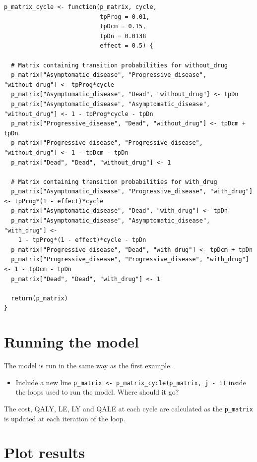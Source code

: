 \begin{verbatim}
p_matrix_cycle <- function(p_matrix, cycle,
                           tpProg = 0.01,
                           tpDcm = 0.15,
                           tpDn = 0.0138
                           effect = 0.5) {
  
  # Matrix containing transition probabilities for without_drug
  p_matrix["Asymptomatic_disease", "Progressive_disease", "without_drug"] <- tpProg*cycle
  p_matrix["Asymptomatic_disease", "Dead", "without_drug"] <- tpDn
  p_matrix["Asymptomatic_disease", "Asymptomatic_disease", "without_drug"] <- 1 - tpProg*cycle - tpDn
  p_matrix["Progressive_disease", "Dead", "without_drug"] <- tpDcm + tpDn
  p_matrix["Progressive_disease", "Progressive_disease", "without_drug"] <- 1 - tpDcm - tpDn
  p_matrix["Dead", "Dead", "without_drug"] <- 1
  
  # Matrix containing transition probabilities for with_drug
  p_matrix["Asymptomatic_disease", "Progressive_disease", "with_drug"] <- tpProg*(1 - effect)*cycle
  p_matrix["Asymptomatic_disease", "Dead", "with_drug"] <- tpDn
  p_matrix["Asymptomatic_disease", "Asymptomatic_disease", "with_drug"] <-
    1 - tpProg*(1 - effect)*cycle - tpDn
  p_matrix["Progressive_disease", "Dead", "with_drug"] <- tpDcm + tpDn
  p_matrix["Progressive_disease", "Progressive_disease", "with_drug"] <- 1 - tpDcm - tpDn
  p_matrix["Dead", "Dead", "with_drug"] <- 1

  return(p_matrix)
}
\end{verbatim}

%
\section{Running the model}
The model is run in the same way as the first example.

\begin{itemize}
\item Include a new line \texttt{p\_matrix <- p\_matrix\_cycle(p\_matrix, j - 1)} inside the loops used to run the model. Where should it go?
\end{itemize}

The cost, QALY, LE, LY and QALE at each cycle are calculated as the \texttt{p\_matrix} is updated at each iteration of the loop.


%
\section{Plot results}

